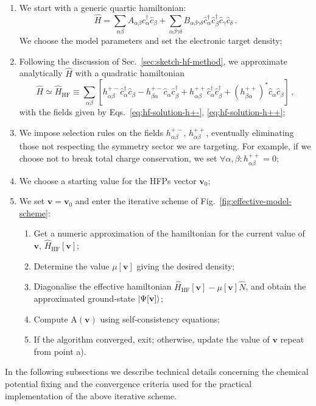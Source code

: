 \begin{enumerate}
	\item We start with a generic quartic hamiltonian:
	\[
		\hat H = \sum_{\alpha\beta} A_{\alpha\beta} \hat c_\alpha^\dagger \hat c_\beta + \sum_{\alpha\beta\gamma\delta} B_{\alpha\beta\gamma\delta} \hat c_\alpha^\dagger \hat c_\beta^\dagger \hat c_\gamma \hat c_\delta \, .
	\]
	We choose the model parameters and set the electronic target density;
	\item Following the discussion of Sec.~\ref{sec:sketch-hf-method}, we approximate analytically $\hat H$ with a quadratic hamiltonian
	\[
		\hat H \simeq \hat H_\mathrm{HF} \equiv \sum_{\alpha\beta} \left[
			h_{\alpha\beta}^{+-} \hat c_\alpha^\dagger \hat c_\beta - h_{\beta\alpha}^{+-} \hat c_\alpha \hat c_\beta^\dagger + 			h_{\alpha\beta}^{++} \hat c_\alpha^\dagger \hat c_\beta^\dagger + \left(h_{\beta\alpha}^{++}\right)^* \hat c_\alpha \hat c_\beta
		\right] \, ,
	\]
	with the fields given by Eqs.~\eqref{eq:hf-solution-h+-}, \eqref{eq:hf-solution-h++};
	\item We impose selection rules on the fields $h_{\alpha\beta}^{+-}$, $h_{\alpha\beta}^{++}$, eventually eliminating those not respecting the symmetry sector we are targeting. For example, if we choose not to break total charge conservation, we set $\forall\alpha,\beta \colon h_{\alpha\beta}^{++}=0$;
	\item We choose a starting value for the HFPs vector $\mathbf{v}_0$;
	\item We set $\mathbf{v} = \mathbf{v}_0$ and enter the iterative scheme of Fig.~\ref{fig:effective-model-scheme}:
	\begin{enumerate}
		\item Get a numeric approximation of the hamiltonian for the current value of $\mathbf{v}$, $\hat H_\mathrm{HF}[\mathbf{v}]$;
		\item Determine the value $\mu [\mathbf{v}]$ giving the desired density;
		\item Diagonalise the effective hamiltonian $\hat H_\mathrm{HF} [\mathbf{v}] - \mu[\mathbf{v}] \hat N$, and obtain the approximated ground-state $\ket{\Psi [\mathbf{v}]}$;
		\item Compute $\mathrm{A}(\mathbf{v})$ using self-consistency equations;
		\item If the algorithm converged, exit; otherwise, update the value of $\mathbf{v}$ repeat from point a).
	\end{enumerate}
\end{enumerate}
In the following subsections we describe technical details concerning the chemical potential fixing and the convergence criteria used for the practical implementation of the above iterative scheme.

